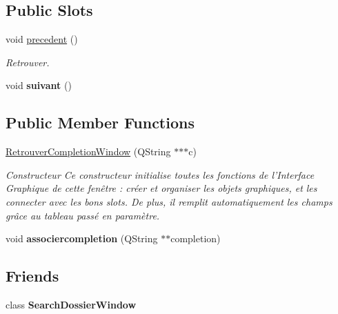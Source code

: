 \subsection*{Public Slots}
\begin{DoxyCompactItemize}
\item 
\hypertarget{class_retrouver_completion_window_a29cbfc2c4c6008dd4975395cfb9cc97a}{void \hyperlink{class_retrouver_completion_window_a29cbfc2c4c6008dd4975395cfb9cc97a}{precedent} ()}\label{class_retrouver_completion_window_a29cbfc2c4c6008dd4975395cfb9cc97a}

\begin{DoxyCompactList}\small\item\em Retrouver. \end{DoxyCompactList}\item 
\hypertarget{class_retrouver_completion_window_a44b071eea4a996a30d5f7ad9ea345dc5}{void {\bfseries suivant} ()}\label{class_retrouver_completion_window_a44b071eea4a996a30d5f7ad9ea345dc5}

\end{DoxyCompactItemize}
\subsection*{Public Member Functions}
\begin{DoxyCompactItemize}
\item 
\hyperlink{class_retrouver_completion_window_ac8977a4ac244917a090cd77f59712abe}{Retrouver\-Completion\-Window} (Q\-String $\ast$$\ast$$\ast$c)
\begin{DoxyCompactList}\small\item\em Constructeur Ce constructeur initialise toutes les fonctions de l'Interface Graphique de cette fenêtre \-: créer et organiser les objets graphiques, et les connecter avec les bons slots. De plus, il remplit automatiquement les champs grâce au tableau passé en paramètre. \end{DoxyCompactList}\item 
\hypertarget{class_retrouver_completion_window_ab7a253bbab907827888e4cf32af54330}{void {\bfseries associercompletion} (Q\-String $\ast$$\ast$completion)}\label{class_retrouver_completion_window_ab7a253bbab907827888e4cf32af54330}

\end{DoxyCompactItemize}
\subsection*{Friends}
\begin{DoxyCompactItemize}
\item 
\hypertarget{class_retrouver_completion_window_a4a44bd2bee11aa6e41709ed1a35a875d}{class {\bfseries Search\-Dossier\-Window}}\label{class_retrouver_completion_window_a4a44bd2bee11aa6e41709ed1a35a875d}

\end{DoxyCompactItemize}


